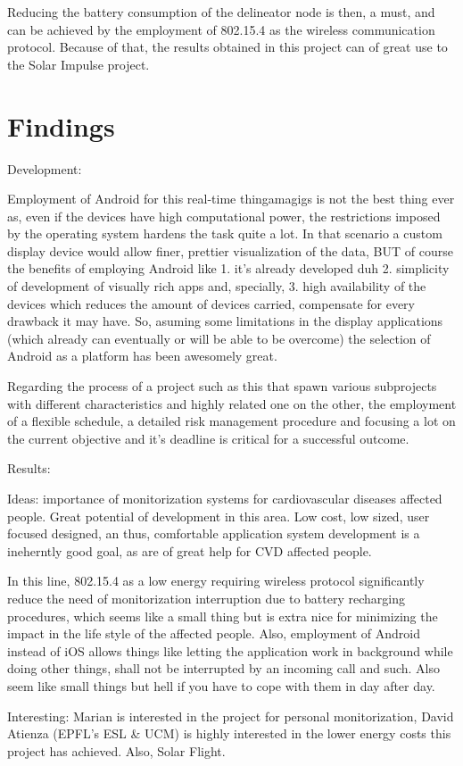 \begin{itemize}
				Reducing the battery consumption of the delineator node is then, a must, and can be achieved by
				the employment of 802.15.4 as the wireless communication protocol. Because of that, the results
				obtained in this project can of great use to the Solar Impulse project.\\
				
		\end{itemize}
	
	\section{Findings}
	\label{sec:end-findings}

		Development:
		
		Employment of Android for this real-time thingamagigs is not the best thing ever as, even if the devices have high computational power, the restrictions imposed by the operating system hardens the task quite a lot. In that scenario a custom display device would allow finer, prettier visualization of the data, BUT of course the benefits of employing Android like 1. it's already developed duh 2. simplicity of development of visually rich apps and, specially, 3. high availability of the devices which reduces the amount of devices carried, compensate for every drawback it may have. So, asuming some limitations in the display applications (which already can eventually or will be able to be overcome) the selection of Android as a platform has been awesomely great.

		Regarding the process of a project such as this that spawn various subprojects with different characteristics and highly related one on the other, the employment of a flexible schedule, a detailed risk management procedure and focusing a lot on the current objective and it's deadline is critical for a successful outcome.

		Results:

		Ideas: importance of monitorization systems for cardiovascular diseases affected people. Great potential of development in this area. Low cost, low sized, user focused designed, an thus, comfortable application system development is a ineherntly good goal, as are of great help for CVD affected people.

		In this line, 802.15.4 as a low energy requiring wireless protocol significantly reduce the need of monitorization interruption due to battery recharging procedures, which seems like a small thing but is extra nice for minimizing the impact in the life style of the affected people. Also, employment of Android instead of iOS allows things like letting the application work in background while doing other things, shall not be interrupted by an incoming call and such. Also seem like small things but hell if you have to cope with them in day after day.

		Interesting: Marian is interested in the project for personal monitorization, David Atienza (EPFL's ESL \& UCM) is highly interested in the lower energy costs this project has achieved. Also, Solar Flight.
